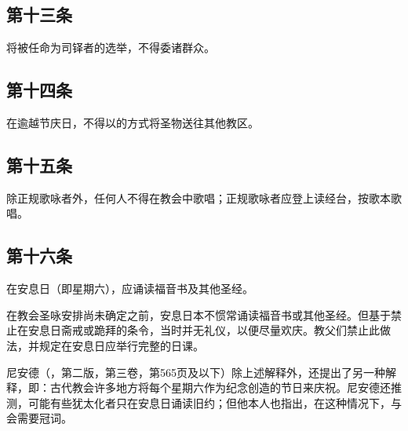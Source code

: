 \subsection{第十三条}

将被任命为司铎者的选举，不得委诸群众。\par


\subsection{第十四条}

在逾越节庆日，不得以的方式将圣物送往其他教区。\par


\subsection{第十五条}

除正规歌咏者外，任何人不得在教会中歌唱；正规歌咏者应登上读经台，按歌本歌唱。\par


\subsection{第十六条}

在安息日（即星期六），应诵读福音书及其他圣经。\par

在教会圣咏安排尚未确定之前，安息日本不惯常诵读福音书或其他圣经。但基于禁止在安息日斋戒或跪拜的条令，当时并无礼仪，以便尽量欢庆。教父们禁止此做法，并规定在安息日应举行完整的日课。\par

尼安德（，第二版，第三卷，第565页及以下）除上述解释外，还提出了另一种解释，即：古代教会许多地方将每个星期六作为纪念创造的节日来庆祝。尼安德还推测，可能有些犹太化者只在安息日诵读旧约；但他本人也指出，在这种情况下，与会需要冠词。\par

\par

